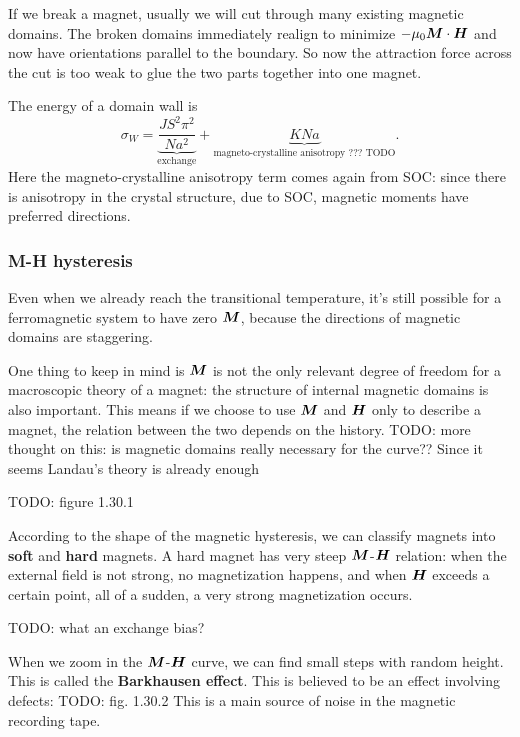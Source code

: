 \documentclass[hyperref, a4paper]{article}
\newcommand*{\concept}[1]{{\textbf{#1}}}
\begin{document}
If we break a magnet,
usually we will cut through many existing magnetic domains.
The broken domains immediately 
realign to minimize $- \mu_0 \vb*{M} \cdot \vb*{H}$
and now have orientations parallel to the boundary.
So now the attraction force across the cut 
is too weak to glue the two parts together into one magnet.

The energy of a domain wall is 
\begin{equation}
    \sigma_W = \underbrace{\frac{J S^2 \pi^2}{N a^2}}_{\text{exchange}} 
    + \underbrace{KNa}_\text{magneto-crystalline anisotropy ??? TODO}.
\end{equation}
Here the magneto-crystalline anisotropy term comes again from SOC: 
since there is anisotropy in the crystal structure, 
due to SOC, 
magnetic moments have preferred directions.

\subsubsection{M-H hysteresis}

Even when we already reach the transitional temperature,
it's still possible for a ferromagnetic system to have zero $\vb*{M}$,
because the directions of magnetic domains are staggering.

One thing to keep in mind is $\vb*{M}$ is not the only relevant degree of freedom 
for a macroscopic theory of a magnet:
the structure of internal magnetic domains is also important.
This means if we choose to use $\vb*{M}$ and $\vb*{H}$ only 
to describe a magnet,
the relation between the two depends on the history.  
TODO: more thought on this: is magnetic domains really necessary for the curve??
Since it seems Landau's theory is already enough

TODO: figure 1.30.1

According to the shape of the magnetic hysteresis,
we can classify magnets into \concept{soft} and \concept{hard} magnets. 
A hard magnet has very steep $\vb*{M}$-$\vb*{H}$ relation:
when the external field is not strong, 
no magnetization happens, 
and when $\vb*{H}$ exceeds a certain point, 
all of a sudden, 
a very strong magnetization occurs. 

TODO: what an exchange bias?

When we zoom in the $\vb*{M}$-$\vb*{H}$ curve, 
we can find small steps with random height.
This is called the \concept{Barkhausen effect}.
This is believed to be an effect involving defects: 
TODO: fig. 1.30.2
This is a main source of noise in the magnetic recording tape.
\end{document}
